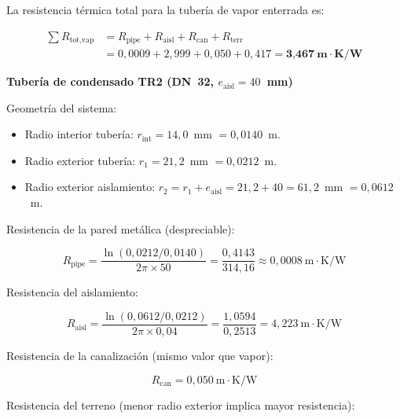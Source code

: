 \documentclass[12pt]{article}
\begin{document}
La resistencia térmica total para la tubería de vapor enterrada es:

\begin{equation}
	\begin{split}
		\sum R_{\text{tot,vap}} & = R_{\text{pipe}} + R_{\text{aisl}} + R_{\text{can}} + R_{\text{terr}}                  \\
		                        & = 0{,}0009 + 2{,}999 + 0{,}050 + 0{,}417 = \textbf{3{,}467}~\textbf{m}\cdot\textbf{K/W}
	\end{split}
	\label{eq:resist_total_TR2_vap}
\end{equation}

\textbf{Tubería de condensado TR2 (DN~32, $e_{\text{aisl}} = 40$~mm)}

Geometría del sistema:

\begin{itemize}[noitemsep]
	\item Radio interior tubería: $r_{\text{int}} = 14{,}0$~mm $= 0{,}0140$~m.
	\item Radio exterior tubería: $r_1 = 21{,}2$~mm $= 0{,}0212$~m.
	\item Radio exterior aislamiento: $r_2 = r_1 + e_{\text{aisl}} = 21{,}2 + 40 = 61{,}2$~mm $= 0{,}0612$~m.
\end{itemize}

Resistencia de la pared metálica (despreciable):

\begin{equation}
	R_{\text{pipe}} = \frac{\ln(0{,}0212 / 0{,}0140)}{2\pi \times 50} = \frac{0{,}4143}{314{,}16} \approx 0{,}0008~\text{m}\cdot\text{K/W}
	\label{eq:resist_pipe_TR2_cond}
\end{equation}

Resistencia del aislamiento:

\begin{equation}
	R_{\text{aisl}} = \frac{\ln(0{,}0612 / 0{,}0212)}{2\pi \times 0{,}04} = \frac{1{,}0594}{0{,}2513} = 4{,}223~\text{m}\cdot\text{K/W}
	\label{eq:resist_aisl_TR2_cond}
\end{equation}

Resistencia de la canalización (mismo valor que vapor):

\begin{equation}
	R_{\text{can}} = 0{,}050~\text{m}\cdot\text{K/W}
	\label{eq:resist_can_TR2_cond}
\end{equation}

Resistencia del terreno (menor radio exterior implica mayor resistencia):
\end{document}
